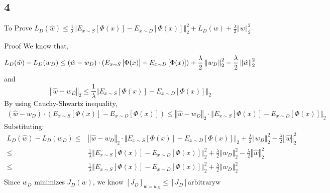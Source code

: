 \documentclass{article}
\begin{document}
\subsection*{4}
\begin{description}
  \item{To Prove} \( L_{D}(\hat{w})\leq\frac{1}{\lambda}\left\Vert E_{x\sim S}\left[\Phi\left(x\right)\right]-E_{x\sim D}\left[\Phi\left(x\right)\right]\right\Vert _{2}^{2}+L_{D}(w)+\frac{\lambda}{2}\left\Vert w\right\Vert _{2}^{2} \)
  \item{Proof}
    We know that, 
    \begin{equation*}
      L_{D}(\hat{w})-L_{D}(w_{D}) \leq  \left(\hat{w}-w_{D}\right)\cdot\left(E_{x\sim S}\left[\Phi(x)\right]-E_{x\sim D}\left[\Phi(x)\right]\right)+\frac{\lambda}{2}\left\Vert w_{D}\right\Vert _{2}^{2}-\frac{\lambda}{2}\left\Vert \hat{w}\right\Vert _{2}^{2} \\
    \end{equation*}
    and
    \begin{equation*}
      \left\Vert \hat{w}-w_{D}\right\Vert _{2}\leq\frac{1}{\lambda}\left\Vert E_{x\sim S}\left[\Phi\left(x\right)\right]-E_{x\sim D}\left[\Phi\left(x\right)\right]\right\Vert _{2}
    \end{equation*}
    By using Cauchy-Shwartz inequality, 
    \begin{align*}
      \left(\hat{w}-w_{D}\right)\cdot\left(E_{x\sim S}\left[\Phi(x)\right]-E_{x\sim D}\left[\Phi(x)\right]\right)\leq\left\Vert \hat{w}-w_{D}\right\Vert _{2}\cdot\left\Vert E_{x\sim S}\left[\Phi(x)\right]-E_{x\sim D}\left[\Phi(x)\right]\right\Vert _{2}
    \end{align*}
    Substituting:
    \begin{align*}
      L_{D}(\hat{w})-L_{D}(w_{D}) \leq & \left\Vert \hat{w}-w_{D}\right\Vert _{2}\cdot\left\Vert E_{x\sim S}\left[\Phi(x)\right]-E_{x\sim D}\left[\Phi(x)\right]\right\Vert _{2}+\frac{\lambda}{2}\left\Vert w_{D}\right\Vert _{2}^{2}-\frac{\lambda}{2}\left\Vert \hat{w}\right\Vert _{2}^{2} \\
      \leq & \frac{1}{\lambda}\left\Vert E_{x\sim S}\left[\Phi(x)\right]-E_{x\sim D}\left[\Phi(x)\right]\right\Vert _{2}^{2}+\frac{\lambda}{2}\left\Vert w_{D}\right\Vert _{2}^{2}-\frac{\lambda}{2}\left\Vert \hat{w}\right\Vert _{2}^{2} \\
      \leq & \frac{1}{\lambda}\left\Vert E_{x\sim S}\left[\Phi(x)\right]-E_{x\sim D}\left[\Phi(x)\right]\right\Vert _{2}^{2}+\frac{\lambda}{2}\left\Vert w_{D}\right\Vert _{2}^{2} \\
    \end{align*}
    Since $ w_{D} $ minimizes $J_{D}(w)$, we know ${\left[J_{D}\right]}_{w=w_{D}}\leq {\left[J_{D}\right]}{\mathrm{arbitrary}\mbox{w}}$\\
    

\end{description}
\end{document}
